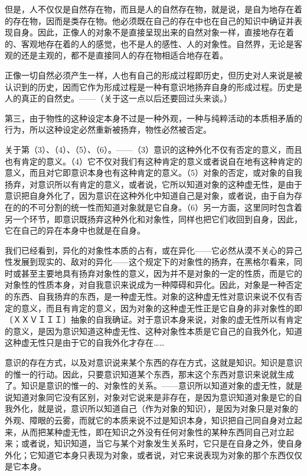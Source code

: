 \documentclass[a4paper,twoside,12pt]{ctexart}
\begin{document}
但是，人不仅仅是自然存在物，而且是人的自然存在物，就是说，是自为地存在着的存在物，因而是类存在物。他必须既在自己的存在中也在自己的知识中确证并表现自身。因此，正像人的对象不是直接呈现出来的自然对象一样，直接地存在着的、客观地存在着的人的感觉，也不是人的感性、人的对象性。自然界，无论是客观的还是主观的，都不是直接同人的存在物相适合地存在着。

正像一切自然必须产生一样，人也有自己的形成过程即历史，但历史对人来说是被认识到的历史，因而它作为形成过程是一种有意识地扬弃自身的形成过程。历史是人的真正的自然史。——（关于这一点以后还要回过头来谈。）

第三，由于物性的这种设定本身不过是一种外观，一种与纯粹活动的本质相矛盾的行为，所以这种设定必然重新被扬弃，物性必然被否定。

关于第（3）、（4）、（5）、（6）。——（3）意识的这种外化不仅有否定的意义，而且也有肯定的意义。（4）它不仅对我们有这种肯定的意义或者说自在地有这种肯定的意义，而且对它即意识本身也有这种肯定的意义。（5）对象的否定，或对象的自我扬弃，对意识所以有肯定的意义，或者说，它所以知道对象的这种虚无性，是由于意识把自身外化了，因为意识在这种外化中知道自己是对象，或者说，由于自为存在的的不可分割的统一性而知道对象就是它自身。（6）另一方面，这里同时包含着另一个环节，即意识既扬弃这种外化和对象性，同样也把它们收回到自身，因此，它在自己的异在本身中也就是在自身。

我们已经看到，异化的对象性本质的占有，或在异化——它必然从漠不关心的异己性发展到现实的、敌对的异化——这个规定下的对象性的扬弃，在黑格尔看来，同时或甚至主要地具有扬弃对象性的意义，因为并不是对象的一定的性质，而是它的对象性的性质本身，对自我意识来说成为一种障碍和异化。因此，对象是一种否定的东西、自我扬弃的东西，是一种虚无性。对象的这种虚无性对意识来说不仅有否定的意义，而且有肯定的意义，因为对象的这种虚无性正是它自身的非对象性的即〔ＸＸＶＩＩＩ〕抽象的自我确证。对于意识本身来说，对象的虚无性所以有肯定的意义，是因为意识知道这种虚无性、这种对象性本质是它自己的自我外化，知道这种虚无性只是由于它的自我外化才存在……

意识的存在方式，以及对意识说来某个东西的存在方式，这就是知识。知识是意识的惟一的行动。因此，只要意识知道某个东西，那末这个东西对意识来说就生成了。知识是意识的惟一的、对象性的关系。——意识所以知道对象的虚无性，就是说知道对象同它没有区别，对象对它说来是非存在，是因为意识知道对象是它的自我外化，就是说，意识所以知道自己（作为对象的知识），是因为对象只是对象的外观、障眼的云雾，而就它的本质来说不过是知识本身，知识把自己同自身对立起来，从而把某种虚无性，即在知识之外没有任何对象性的某种东西同自己对立起来；或者说，知识知道，当它与某个对象发生关系时，它只是在自身之外，使自身外化；它知道它本身只表现为对象，或者说，对它来说表现为对象的那个东西仅仅是它本身。
\end{document}
